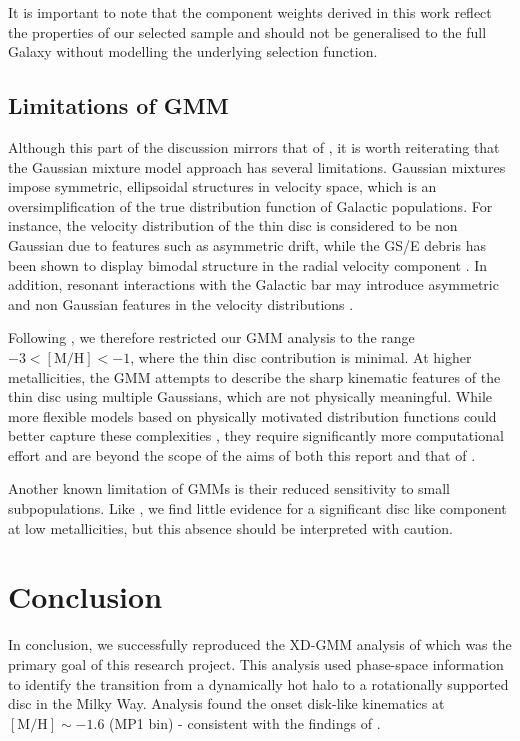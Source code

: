 \documentclass[a4paper,12pt]{article}
\begin{document}
It is important to note that the component weights derived in this work reflect the properties of our 
selected sample and should not be generalised to the full Galaxy without modelling the underlying 
selection function.


\subsection{Limitations of GMM}

Although this part of the discussion mirrors that of \citet{zhang2024existencemetalpoordiscmilky}, 
it is worth reiterating that the Gaussian mixture model approach has several limitations. 
Gaussian mixtures impose symmetric, ellipsoidal structures in velocity space, 
which is an oversimplification of the true distribution function of Galactic populations. 
For instance, the velocity distribution of the thin disc is considered to be non Gaussian 
due to features such as asymmetric drift, while the GS/E debris has been shown to display bimodal 
structure in the radial velocity component \citep{Lancaster2019,Necib2019}. 
In addition, resonant interactions with the Galactic bar may introduce asymmetric and non Gaussian 
features in the velocity distributions \citep[e.g.][]{Dillamore2023}. 

Following \citet{zhang2024existencemetalpoordiscmilky}, we therefore restricted our GMM analysis 
to the range $-3 < \mathrm{[M/H]} < -1$, where the thin disc contribution is minimal. At higher 
metallicities, the GMM attempts to describe the sharp kinematic features of the thin disc using 
multiple Gaussians, which are not physically meaningful. While more flexible models based on 
physically motivated distribution functions could better capture these complexities 
\citep[e.g.][]{Binney2010}, they require significantly more computational effort and are 
beyond the scope of the aims of both this report and that of \citet{zhang2024existencemetalpoordiscmilky}.

Another known limitation of GMMs is their reduced sensitivity to small subpopulations. 
Like \citet{zhang2024existencemetalpoordiscmilky}, we find little evidence for a significant 
disc like component at low metallicities, but this absence should be interpreted with caution. 

\section{Conclusion}

In conclusion, we successfully reproduced the XD-GMM analysis of \citet{zhang2024existencemetalpoordiscmilky}
which was the primary goal of this research project. This analysis used phase-space information
to identify the transition from a dynamically hot halo to a rotationally supported disc in the Milky Way.
Analysis found the onset disk-like kinematics at $[\mathrm{M/H}]\sim-1.6$ (MP1 bin) - consistent with the
findings of \citet{zhang2024existencemetalpoordiscmilky}.
\end{document}
